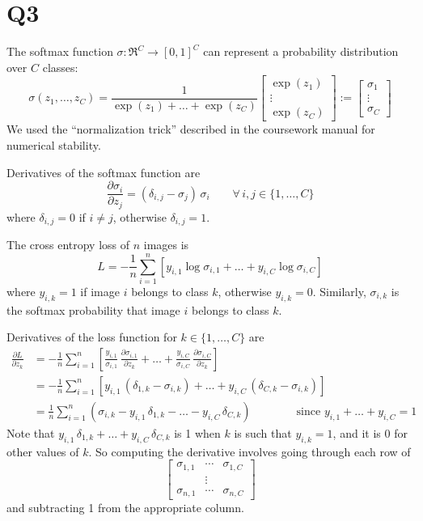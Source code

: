 \documentclass[12pt, a4paper]{article}
\begin{document}
\section*{Q3}
The softmax function $\sigma : \Re^C \rightarrow [0, 1]^C$ can represent a probability distribution over $C$ classes:
\[ \sigma(z_1, \dots, z_C) = \frac{1}{\exp(z_1) + \dots + \exp(z_C)}
   \begin{bmatrix} \exp(z_1) \\ \vdots \\ \exp(z_C) \end{bmatrix} :=
   \begin{bmatrix} \sigma_1  \\ \vdots \\ \sigma_C  \end{bmatrix} \]
We used the ``normalization trick'' described in the coursework manual for numerical stability.\par
\bigskip
Derivatives of the softmax function are
\[ \frac{\partial \sigma_i}{\partial z_j} = (\delta_{i,j} - \sigma_j) \, \sigma_i \qquad \forall \, i, j \in \{1, \dots, C\} \]
where $\delta_{i,j} = 0$ if $i \neq j$, otherwise $\delta_{i,j} = 1$.\par
\bigskip
The cross entropy loss of $n$ images is
\[ L = -\frac1n \sum_{i=1}^n \left[ y_{i,1} \log \sigma_{i,1} + \dots + y_{i,C} \log \sigma_{i,C} \right] \]
where $y_{i,k} = 1$ if image $i$ belongs to class $k$, otherwise $y_{i,k} = 0$. Similarly, $\sigma_{i,k}$ is the softmax probability that image $i$ belongs to class $k$.\par
\bigskip
Derivatives of the loss function for $k \in \{1, \dots, C\}$ are
\begin{align*}
    \frac{\partial L}{\partial z_k}
    &= -\frac1n \sum_{i=1}^n \left[ \frac{y_{i,1}}{\sigma_{i,1}} \, \frac{\partial \sigma_{i,1}}{\partial z_k} + \dots + \frac{y_{i,C}}{\sigma_{i,C}} \, \frac{\partial \sigma_{i,C}}{\partial z_k} \right] \\
    &= -\frac1n \sum_{i=1}^n \left[ y_{i,1} \, (\delta_{1,k} - \sigma_{i,k}) + \dots + y_{i,C} \, (\delta_{C,k} - \sigma_{i,k}) \right] \\
    &= \frac1n \sum_{i=1}^n \left( \sigma_{i,k} - y_{i,1} \, \delta_{1,k} - \dots - y_{i,C} \, \delta_{C,k} \right) \qquad \qquad \text{since } y_{i,1} + \dots + y_{i,C} = 1
\end{align*}
Note that $y_{i,1} \, \delta_{1,k} + \dots + y_{i,C} \, \delta_{C,k}$ is 1 when $k$ is such that $y_{i,k} = 1$, and it is 0 for other values of $k$. So computing the derivative involves going through each row of
\[ \begin{bmatrix}
   \sigma_{1,1} & \dotsm & \sigma_{1,C} \\
   & \vdots & \\
   \sigma_{n,1} & \dotsm & \sigma_{n,C}
   \end{bmatrix} \]
and subtracting 1 from the appropriate column.
\end{document}
